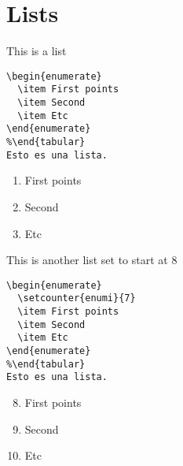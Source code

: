 \section{Lists}\label{sec:Elements_lists}
This is a list
\begin{lstlisting}
\begin{enumerate}
  \item First points
  \item Second
  \item Etc
\end{enumerate}
%\end{tabular}
Esto es una lista.
\end{lstlisting}

\begin{enumerate}
  \item First points
  \item Second
  \item Etc
\end{enumerate}

This is another list set to start at 8
  
\begin{lstlisting}
\begin{enumerate}
  \setcounter{enumi}{7}	
  \item First points
  \item Second
  \item Etc
\end{enumerate}
%\end{tabular}
Esto es una lista.
\end{lstlisting}

\begin{enumerate}
  \setcounter{enumi}{7}
  \item First points
  \item Second
  \item Etc
\end{enumerate}

